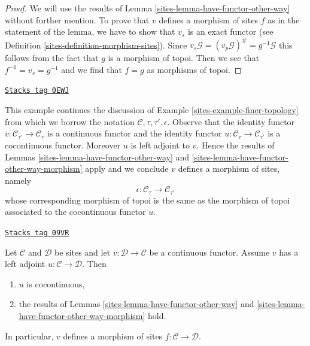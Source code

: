 \begin{proof}

We will use the results of Lemma \ref{sites-lemma-have-functor-other-way}
without further mention. To prove that $v$ defines a morphism of sites
$f$ as in the statement of the lemma,
we have to show that $v_s$ is an exact functor (see
Definition \ref{sites-definition-morphism-sites}). Since
$v_s\mathcal{G} = (v_p\mathcal{G})^\# = g^{-1}\mathcal{G}$
this follows from the fact that $g$ is a morphism of topoi.
Then we see that $f^{-1} = v_s = g^{-1}$ and we find that $f = g$
as morphisms of topoi.
\end{proof}

\begin{example}
\label{sites-example-finer-topology-bis}
\href{https://stacks.math.columbia.edu/tag/0EWJ}{\texttt{Stacks tag 0EWJ}}

This example continues the discussion of
Example \ref{sites-example-finer-topology}
from which we borrow the notation $\mathcal{C}, \tau, \tau', \epsilon$.
Observe that the identity functor $v : \mathcal{C}_{\tau'} \to \mathcal{C}_\tau$
is a continuous functor and the identity functor
$u : \mathcal{C}_\tau \to \mathcal{C}_{\tau'}$
is a cocontinuous functor. Moreover $u$ is left adjoint to $v$.
Hence the results of
Lemmas \ref{sites-lemma-have-functor-other-way} and
\ref{sites-lemma-have-functor-other-way-morphism}
apply and we conclude $v$ defines a morphism of sites, namely
$$
\epsilon : \mathcal{C}_\tau \longrightarrow \mathcal{C}_{\tau'}
$$
whose corresponding morphism of topoi is the same as the morphism
of topoi associated to the cocontinuous functor $u$.
\end{example}

\begin{lemma}
\label{sites-lemma-continuous-with-continuous-left-adjoint}
\href{https://stacks.math.columbia.edu/tag/09VR}{\texttt{Stacks tag 09VR}}

Let $\mathcal{C}$ and $\mathcal{D}$ be sites and let
$v : \mathcal{D} \to \mathcal{C}$ be a continuous functor.
Assume $v$ has a left adjoint $u : \mathcal{C} \to \mathcal{D}$. Then
\begin{enumerate}
\item $u$ is cocontinuous,
\item the results of Lemmas \ref{sites-lemma-have-functor-other-way} and
\ref{sites-lemma-have-functor-other-way-morphism} hold.
\end{enumerate}
In particular, $v$ defines a morphism of sites
$f : \mathcal{C} \to \mathcal{D}$.
\end{lemma}

